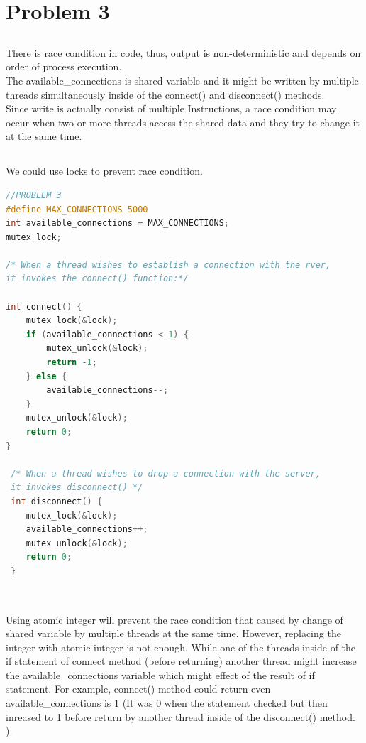 \documentclass{article}
\newcommand\tab[1][0.5cm]{\hspace*{#1}}
\begin{document}
\section{Problem 3}

\subsection{}
\tab There is race condition in code, thus, output is non-deterministic and depends on order of process execution.
\\The available\_connections is shared variable and it might be written by multiple threads simultaneously inside of the connect() and disconnect() methods.
\\Since write is actually consist of multiple Instructions, a race condition may occur when two or more threads access the shared data and they try to change it at the same time.
\subsection{}
We could use locks to prevent race condition.

\begin{lstlisting}[language=C]
//PROBLEM 3
#define MAX_CONNECTIONS 5000
int available_connections = MAX_CONNECTIONS;
mutex lock;

/* When a thread wishes to establish a connection with the rver,
it invokes the connect() function:*/

int connect() {
    mutex_lock(&lock); 
    if (available_connections < 1) {
        mutex_unlock(&lock);
        return -1;
    } else {
        available_connections--;
    }
    mutex_unlock(&lock);
    return 0;
}

 /* When a thread wishes to drop a connection with the server,
 it invokes disconnect() */
 int disconnect() {
    mutex_lock(&lock);
    available_connections++;
    mutex_unlock(&lock);
    return 0;
 }
\end{lstlisting}

\subsection{}
\tab 
\\ \tab Using atomic integer will prevent the race condition that caused by change of shared variable by multiple threads at the same time. However, replacing the integer with atomic integer is not enough. While one of the threads inside of the if statement of connect method (before returning) another thread might increase the available\_connections variable which might effect of the result of if statement. For example, connect() method could return  even available\_connections is 1 (It was 0 when the statement checked but then inreased to 1 before return by another thread inside of the disconnect() method. ).
\newpage
\end{document}
